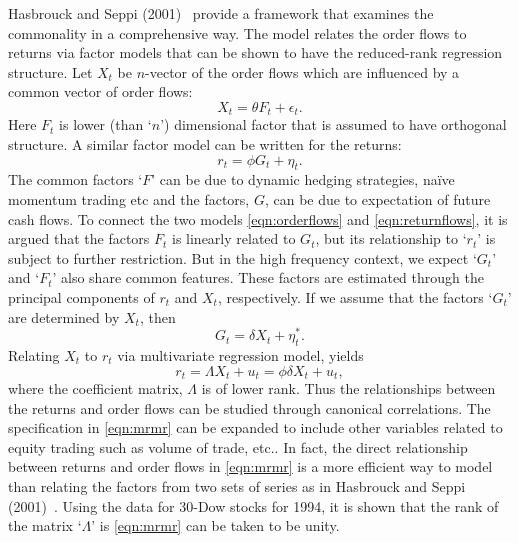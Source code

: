 Hasbrouck and Seppi (2001)~\cite{seppi2001} provide a framework that examines the commonality in a comprehensive way. The model relates the order flows to returns via factor models that can be shown to have the reduced-rank regression structure. Let $X_t$ be $n$-vector of the order flows which are influenced by a common vector of order flows:
	\begin{equation} \label{eqn:orderflows}
	X_t= \theta F_t + \epsilon_t.
	\end{equation}
Here $F_t$ is lower (than `$n$') dimensional factor that is assumed to have orthogonal structure. A similar factor model can be written for the returns:
	\begin{equation} \label{eqn:returnflows}
	r_t= \phi G_t + \eta_t.
	\end{equation}
The common factors `$F$' can be due to dynamic hedging strategies, na\"{i}ve momentum trading etc and the factors, $G$, can be due to expectation of future cash flows. To connect the two models \eqref{eqn:orderflows} and \eqref{eqn:returnflows}, it is argued that the factors $F_t$ is linearly related to $G_t$, but its relationship to `$r_t$' is subject to further restriction. But in the high frequency context, we expect `$G_t$' and `$F_t$' also share common features. These factors are estimated through the principal components of $r_t$ and $X_t$, respectively. If we assume that the factors `$G_t$' are determined by $X_t$, then
	\begin{equation} \label{eqn:determinedfactors}
	G_t= \delta X_t + \eta_t^*.
	\end{equation}
Relating $X_t$ to $r_t$ via multivariate regression model, yields 
	\begin{equation} \label{eqn:mrmr}
	r_t= \Lambda X_t + u_t = \phi \delta X_t + u_t,
	\end{equation}
where the coefficient matrix, $\Lambda$ is of lower rank. Thus the relationships between the returns and order flows can be studied through canonical correlations. The specification in \eqref{eqn:mrmr} can be expanded to include other variables related to equity trading such as volume of trade, etc.. In fact, the direct relationship between returns and order flows in \eqref{eqn:mrmr} is a more efficient way to model than relating the factors from two sets of series as in Hasbrouck and Seppi (2001)~\cite{seppi2001}. Using the data for 30-Dow stocks for 1994, it is shown that the rank of the matrix `$\Lambda$' is \eqref{eqn:mrmr} can be taken to be unity. 



